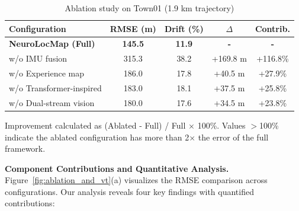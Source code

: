 \begin{table}[t]
\centering
\caption{Ablation study on Town01 (1.9 km trajectory)}
\label{tab:ablation}
\begin{threeparttable}
\begin{tabular}{lcccc}
\toprule
Configuration & RMSE (m) & Drift (\%) & $\Delta$ & Contrib. \\
\midrule
\textbf{NeuroLocMap (Full)} & \textbf{145.5} & \textbf{11.9} & \textbf{-} & \textbf{-} \\
\midrule
w/o IMU fusion & 315.3 & 38.2 & +169.8 m & +116.8\%\tnote{a} \\
w/o Experience map & 186.0 & 17.8 & +40.5 m & +27.9\% \\
w/o Trans\-form\-er-in\-spired & 183.0 & 18.1 & +37.5 m & +25.8\% \\
w/o Dual-stream vision & 180.0 & 17.6 & +34.5 m & +23.8\% \\
\bottomrule
\end{tabular}
\begin{tablenotes}
\footnotesize
\item[a] Improvement calculated as (Ablated - Full) / Full $\times$ 100\%. Values $>$100\% indicate the ablated configuration has more than 2$\times$ the error of the full framework.
\end{tablenotes}
\end{threeparttable}
\end{table}

\textbf{Component Contributions and Quantitative Analysis.} Figure~\ref{fig:ablation_and_vt}(a) visualizes the RMSE comparison across configurations. Our analysis reveals four key findings with quantified contributions:

